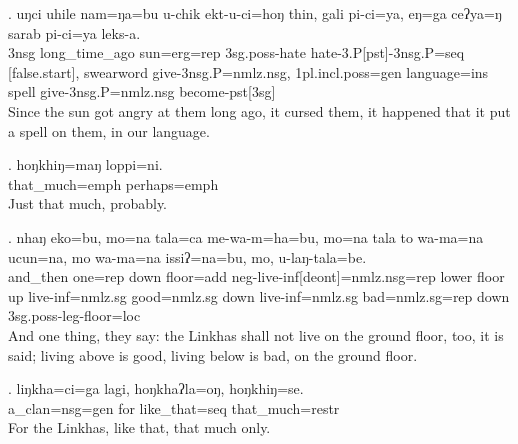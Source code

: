 \exg. uŋci uhile nam=ŋa=bu u-chik ekt-u-ci=hoŋ thin, gali pi-ci=ya,  eŋ=ga ceʔya=ŋ sarab pi-ci=ya leks-a.\\
{\sc 3nsg} long\_time\_ago sun{\sc =erg=rep} {\sc 3sg.poss-}hate hate{\sc -3.P[pst]-3nsg.P=seq} [false.start], swearword give{\sc -3nsg.P=nmlz.nsg}, {\sc 1pl.incl.poss=gen} language{\sc =ins} spell give{\sc -3nsg.P=nmlz.nsg} become{\sc -pst[3sg]}\\
Since the sun got angry at them long ago, it cursed them, it happened that it put a spell on them, in our language.



\exg. hoŋkhiŋ=maŋ loppi=ni.\\
that\_much{\sc =emph} perhaps{\sc =emph}\\
Just that much, probably.



\exg. nhaŋ eko=bu, mo=na tala=ca me-wa-m=ha=bu, mo=na tala to wa-ma=na ucun=na, mo wa-ma=na issiʔ=na=bu, mo, u-laŋ-tala=be.\\
and\_then one{\sc =rep} down floor{\sc =add} {\sc neg-}live{\sc -inf[deont]=nmlz.nsg=rep} lower floor up live{\sc -inf=nmlz.sg} good{\sc =nmlz.sg} down live{\sc -inf=nmlz.sg} bad{\sc =nmlz.sg=rep} down {\sc 3sg.poss}-leg-floor{\sc =loc}\\
And one thing, they say: the Linkhas shall not live on the ground floor, too, it is said; living above is good, living below is bad, on the
ground floor.


\exg. liŋkha=ci=ga lagi, hoŋkhaʔla=oŋ, hoŋkhiŋ=se.\\
a\_clan{\sc =nsg=gen} for like\_that{\sc =seq} that\_much{\sc =restr}\\
For the Linkhas, like that, that much only.



